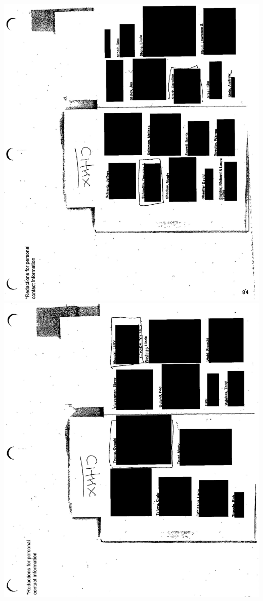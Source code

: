 \documentclass[10pt]{article}
\begin{document}
\includegraphics[max width=\textwidth, center]{2025_02_27_dd68c3d38de88f0516d9g-201}\\
\includegraphics[max width=\textwidth, center]{2025_02_27_dd68c3d38de88f0516d9g-202}\\
\end{document}
